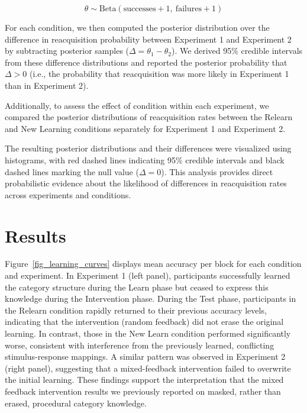 \documentclass{article}
\begin{document}
\begin{equation}
\theta \sim \mathrm{Beta}(\text{successes} + 1,\ \text{failures} + 1)
\end{equation}

For each condition, we then computed the posterior
distribution over the difference in reacquisition
probability between Experiment 1 and Experiment 2 by
subtracting posterior samples ($\Delta = \theta_1 -
\theta_2$). We derived 95\% credible intervals from these
difference distributions and reported the posterior
probability that $\Delta > 0$ (i.e., the probability that
reacquisition was more likely in Experiment 1 than in
Experiment 2).

Additionally, to assess the effect of condition within each
experiment, we compared the posterior distributions of
reacquisition rates between the Relearn and New Learning
conditions separately for Experiment 1 and Experiment 2.

The resulting posterior distributions and their differences
were visualized using histograms, with red dashed lines
indicating 95\% credible intervals and black dashed lines
marking the null value ($\Delta = 0$). This analysis
provides direct probabilistic evidence about the likelihood
of differences in reacquisition rates across experiments and
conditions.

\section{Results}
Figure~\ref{fig_learning_curves} displays mean accuracy per
block for each condition and experiment. In Experiment 1
(left panel), participants successfully learned the category
structure during the Learn phase but ceased to express this
knowledge during the Intervention phase. During the Test
phase, participants in the Relearn condition rapidly
returned to their previous accuracy levels, indicating that
the intervention (random feedback) did not erase the
original learning. In contrast, those in the New Learn
condition performed significantly worse, consistent with
interference from the previously learned, conflicting
stimulus-response mappings. A similar pattern was observed
in Experiment 2 (right panel), suggesting that a
mixed-feedback intervention failed to overwrite the initial
learning. These findings support the interpretation that the
mixed feedback intervention results we previously reported
on masked, rather than erased, procedural category
knowledge.
\end{document}

